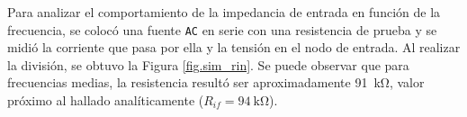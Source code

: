 

Para analizar el comportamiento de la impedancia de entrada en función de la frecuencia, se colocó una fuente \texttt{AC} en serie con una resistencia de prueba y se midió la corriente que pasa por ella y la tensión en el nodo de entrada. Al realizar la división, se obtuvo la Figura \ref{fig.sim_rin}. Se puede observar que para frecuencias medias, la resistencia resultó ser aproximadamente \SI{91}{\kilo\ohm}, valor próximo al hallado analíticamente ($R_{if}=\SI{94}{\kilo\ohm}$).
